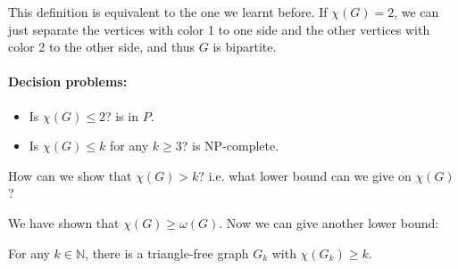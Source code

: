 \begin{remark}
    This definition is equivalent to the one we learnt before. If \(\chi (G) = 2\), we can just separate the vertices with color 1 to one side and the other vertices with color 2 to the other side, and thus \(G\) is bipartite. 
\end{remark}

\paragraph{Decision problems:}
\begin{itemize}
    \item Is \(\chi (G) \le 2\)? is in \(P\). 
    \item Is \(\chi (G) \le k\) for any \(k \ge 3\)? is NP-complete.    
\end{itemize}

\begin{question}
    How can we show that \(\chi (G) > k\)? i.e. what lower bound can we give on \(\chi (G)\)?  
\end{question}

We have shown that \(\chi (G) \ge \omega (G)\). Now we can give another lower bound:
\begin{theorem}[Mycielski]
    For any \(k \in \mathbb{N}\), there is a triangle-free graph \(G_k\) with \(\chi (G_k) \ge k\).   
\end{theorem} 

